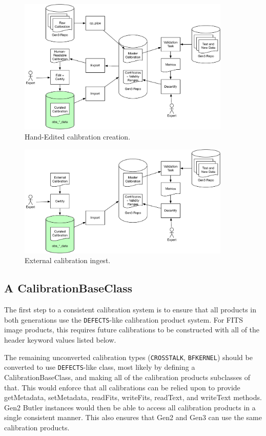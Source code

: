 \documentclass[DM,authoryear,toc]{lsstdoc}
\begin{document}
\begin{figure}
  \caption{Hand-Edited calibration creation.}
  \centering
  \includegraphics[width=0.9\textwidth]{figures/Hand-Edited_Calibration.pdf}
\end{figure}

\begin{figure}
  \caption{External calibration ingest.}
  \centering
  \includegraphics[width=0.9\textwidth]{figures/External_Calibration.pdf}
\end{figure}


\subsection{A CalibrationBaseClass}
The first step to a consistent calibration system is to ensure that
all products in both generations use the \verb|DEFECTS|-like calibration
product system.  For FITS image products, this requires future
calibrations to be constructed with all of the header keyword values
listed below.

The remaining unconverted calibration types (\verb|CROSSTALK|, \verb|BFKERNEL|)
should be converted to use \verb|DEFECTS|-like class, most likely by defining
a CalibrationBaseClass, and making all of the calibration products
subclasses of that.  This would enforce that all calibrations can be
relied upon to provide getMetadata, setMetadata, readFits, writeFits,
readText, and writeText methods.  Gen2 Butler instances would then be
able to access all calibration products in a single consistent manner.
This also ensures that Gen2 and Gen3 can use the same calibration
products.
\end{document}
